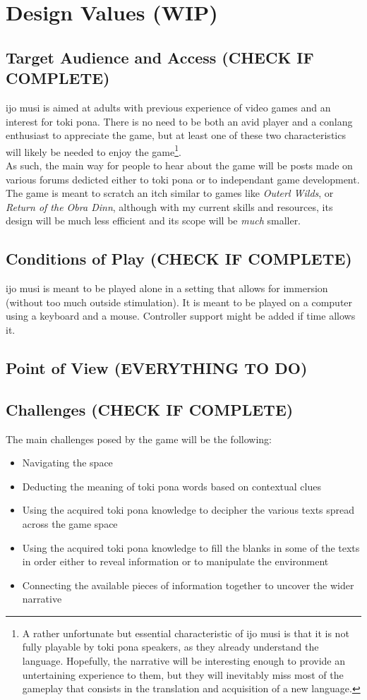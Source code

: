 \documentclass{scrartcl}
\begin{document}
	\section{Design Values (WIP)}
		\subsection{Target Audience and Access (CHECK IF COMPLETE)}
			ijo musi is aimed at adults with previous experience of video games and an interest for toki pona. There is no need to be both an avid player and a conlang enthusiast to appreciate the game, but at least one of these two characteristics will likely be needed to enjoy the game\footnote{A rather unfortunate but essential characteristic of ijo musi is that it is not fully playable by toki pona speakers, as they already understand the language. Hopefully, the narrative will be interesting enough to provide an untertaining experience to them, but they will inevitably miss most of the gameplay that consists in the translation and acquisition of a new language.}.\\
			As such, the main way for people to hear about the game will be posts made on various forums dedicted either to toki pona or to independant game development.\\
			The game is meant to scratch an itch similar to games like \textit{Outerl Wilds}, or \textit{Return of the Obra Dinn}, although with my current skills and resources, its design will be much less efficient and its scope will be \textit{much} smaller.
		\subsection{Conditions of Play (CHECK IF COMPLETE)}
			ijo musi is meant to be played alone in a setting that allows for immersion (without too much outside stimulation). It is meant to be played on a computer using a keyboard and a mouse. Controller support might be added if time allows it.  
		\subsection{Point of View (EVERYTHING TO DO)}
		\subsection{Challenges (CHECK IF COMPLETE)}
			The main challenges posed by the game will be the following:
			\begin{itemize}
				\item Navigating the space
				\item Deducting the meaning of toki pona words based on contextual clues
				\item Using the acquired toki pona knowledge to decipher the various texts spread across the game space
				\item Using the acquired toki pona knowledge to fill the blanks in some of the texts in order either to reveal information or to manipulate the environment
				\item Connecting the available pieces of information together to uncover the wider narrative
			\end{itemize}
\end{document}
